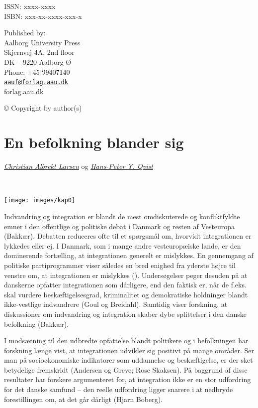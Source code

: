 \documentclass[
]{book}
\begin{document}
\newpage

ISSN: xxxx-xxxx\\
ISBN: xxx-xx-xxxx-xxx-x

Published by:\\
Aalborg University Press\\
Skjernvej 4A, 2nd floor\\
DK -- 9220 Aalborg Ø\\
Phone: +45 99407140\\
\href{mailto:aauf@forlag.aau.dk}{\nolinkurl{aauf@forlag.aau.dk}}\\
forlag.aau.dk

© Copyright by author(s)

\newpage

\tableofcontents

\chapter{En befolkning blander sig}\label{kap1}


\emph{\href{https://vbn.aau.dk/en/persons/albrekt}{Christian Albrekt Larsen}} og \emph{\href{https://vbn.aau.dk/en/persons/hpq}{Hans-Peter Y. Qvist}}

~~~~

\texttt{[image: images/kap0]}

\newpage

Indvandring og integration er blandt de mest omdiskuterede og konfliktfyldte emner i den offentlige og politiske debat i Danmark og resten af Vesteuropa (Bakkær). Debatten reduceres ofte til et spørgsmål om, hvorvidt integrationen er lykkedes eller ej. I Danmark, som i mange andre vesteuropæiske lande, er den dominerende fortælling, at integrationen generelt er mislykkes. En gennemgang af politiske partiprogrammer viser således en bred enighed fra yderste højre til venstre om, at integrationen er mislykkes (). Undersøgelser peger desuden på at danskerne opfatter integrationen som dårligere, end den faktisk er, når de f.eks. skal vurdere beskæftigelsesgrad, kriminalitet og demokratiske holdninger blandt ikke-vestlige indvandrere (Goul og Breidahl). Samtidig viser forskning, at diskussioner om indvandring og integration skaber dybe splittelser i den danske befolkning (Bakkær).

I modsætning til den udbredte opfattelse blandt politikere og i befolkningen har forskning længe vist, at integrationen udvikler sig positivt på mange områder. Ser man på socioøkonomiske indikatorer som uddannelse og beskæftigelse, er der sket betydelige fremskridt (Andersen og Greve; Rose Skaksen). På baggrund af disse resultater har forskere argumenteret for, at integration ikke er en stor udfordring for det danske samfund -- den reelle udfordring ligger snarere i at nedbryde forestillingen om, at det går dårligt (Hjarn Boberg).
\end{document}
